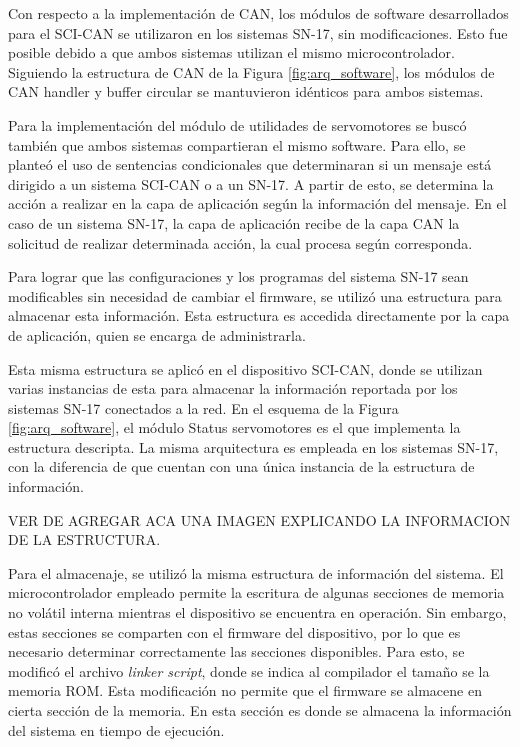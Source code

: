 Con respecto a la implementación de CAN, los módulos de software desarrollados para el SCI-CAN se utilizaron en los sistemas SN-17, sin modificaciones. Esto fue posible debido a que ambos sistemas utilizan el mismo microcontrolador. Siguiendo la estructura de CAN de la Figura \ref{fig:arq_software}, los módulos de CAN handler y buffer circular se mantuvieron idénticos para ambos sistemas.

Para la implementación del módulo de utilidades de servomotores se buscó también que ambos sistemas compartieran el mismo software. Para ello, se planteó el uso de sentencias condicionales que determinaran si un mensaje está dirigido a un sistema SCI-CAN o a un SN-17. A partir de esto, se determina la acción a realizar en la capa de aplicación según la información del mensaje. En el caso de un sistema SN-17, la capa de aplicación recibe de la capa CAN la solicitud de realizar determinada acción, la cual procesa según corresponda.

Para lograr que las configuraciones y los programas del sistema SN-17 sean modificables sin necesidad de cambiar el firmware, se utilizó una estructura para almacenar esta información. Esta estructura es accedida directamente por la capa de aplicación, quien se encarga de administrarla. 

Esta misma estructura se aplicó en el dispositivo SCI-CAN, donde se utilizan varias instancias de esta para almacenar la información reportada por los sistemas SN-17 conectados a la red. En el esquema de la Figura \ref{fig:arq_software}, el módulo Status servomotores es el que implementa la estructura descripta. La misma arquitectura es empleada en los sistemas SN-17, con la diferencia de que cuentan con una única instancia de la estructura de información.

VER DE AGREGAR ACA UNA IMAGEN EXPLICANDO LA INFORMACION DE LA ESTRUCTURA.

Para el almacenaje, se utilizó la misma estructura de información del sistema. El microcontrolador empleado permite la escritura de algunas secciones de memoria no volátil interna mientras el dispositivo se encuentra en operación. Sin embargo, estas secciones se comparten con el firmware del dispositivo, por lo que es necesario determinar correctamente las secciones disponibles. Para esto, se modificó el archivo \textit{linker script}, donde se indica al compilador el tamaño se la memoria ROM. Esta modificación no permite que el firmware se almacene en cierta sección de la memoria. En esta sección es donde se almacena la información del sistema en tiempo de ejecución.

